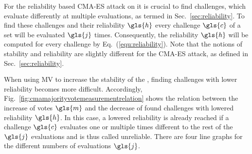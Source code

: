 For the reliability based \ac{CMA-ES} attack on \apufs it is crucial to find challenges, which evaluate differently at multiple evaluations, as termed in Sec.\ \ref{sec:reliability}.
To find these challenges and their reliability $\gls{h}$ every challenge $\gls{c}$ of a set will be evaluated $\gls{j}$ times.
Consequently, the reliability $\gls{h}$ will be computed for every challenge by Eq.\ (\ref{equ:reliability}).
Note that the notions of stability and reliability are slightly different for the \ac{CMA-ES} attack, as defined in Sec.\ \ref{sec:reliability}.

When using \ac{MV} to increase the stability of the \apuf, finding challenges with lower reliability becomes more difficult.
Accordingly, Fig.\ \ref{fig:cmamajorityvotemeasurementrelation} shows the relation between the increase of votes $\gls{m}$ and the decrease of found challenges with lowered reliability $\gls{h}$.
In this case, a lowered reliability is already reached if a challenge $\gls{c}$ evaluates one or multiple times different to the rest of the $\gls{j}$ evaluations and is thus called unreliable.
There are four line graphs for the different numbers of evaluations $\gls{j}$.


